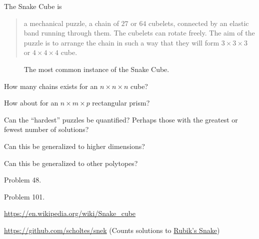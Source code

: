 \documentclass{article}
\begin{document}
The Snake Cube is \begin{quote}
  a mechanical puzzle, a chain of $27$ or $64$ cubelets, connected by an elastic
  band running through them. The cubelets can rotate freely. The aim of the
  puzzle is to arrange the chain in such a way that they will form
  $3 \times 3 \times 3$ or $4 \times 4 \times 4$ cube.
\end{quote}

\begin{figure}[ht!]
  \centering
  \caption{The most common instance of the Snake Cube.}
\end{figure}

\begin{question}
  How many chains exists for an $n \times n \times n$ cube?
\end{question}

\begin{related}
  \item How about for an $n \times m \times p$ rectangular prism?
  \item Can the ``hardest'' puzzles be quantified? Perhaps those with the
  greatest or fewest number of solutions?
  \item Can this be generalized to higher dimensions?
  \item Can this be generalized to other polytopes?
\end{related}

\begin{references}
  \item Problem 48.
  \item Problem 101.
  \item \url{https://en.wikipedia.org/wiki/Snake_cube}
  \item \url{https://github.com/scholtes/snek} (Counts solutions to \href{https://en.wikipedia.org/wiki/Rubik%27s_Snake}{Rubik's Snake})
\end{references}
\end{document}
